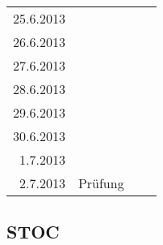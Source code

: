 \begin{tabular}{r l p{} l}
\rowcolor{white} 25.6.2013 &               &  &  \\
\rowcolor{lgray} 26.6.2013 &               &  &  \\
\rowcolor{white} 27.6.2013 &               &  &  \\
\rowcolor{lgray} 28.6.2013 &               &  &  \\
\rowcolor{white} 29.6.2013 &               &  &  \\
\rowcolor{lgray} 30.6.2013 &               &  &  \\
\rowcolor{white}  1.7.2013 &               &  &  \\
\rowcolor{lgray}  2.7.2013 & Prüfung       &  &  \\
\end{tabular}

\subsection{STOC}
